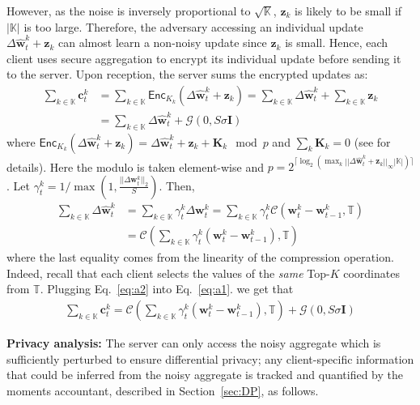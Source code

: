 \documentclass[accepted]{uai2021} %
\newcommand{\mbf}[1]{{\mathbf{#1}}}
\newcommand{\TOPK}{Top-$K$\xspace}
\begin{document}
However, as the noise is inversely proportional to $\sqrt{\mathbb{K}}$, 
$\mbf{z}_{k}$ is likely to be small if $|\mathbb{K}|$ is too large. Therefore, the adversary accessing an individual update $\Delta \hat{\mbf{w}}_t^k + \mbf{z}_{k}$ can almost learn a non-noisy update since $\mbf{z}_{k}$ is small. Hence, each client uses secure aggregation to encrypt its individual update before sending it to the server. Upon reception, the server sums the encrypted updates as:
\begin{align}
\sum_{k\in\mathbb{K}} \mathbf{c}_t^k &= \sum_{k\in\mathbb{K}}\mathsf{Enc}_{K_k}(\Delta \hat{\mbf{w}}_t^k + \mbf{z}_{k}) \nonumber 
 = \sum_{k\in\mathbb{K}} \Delta \hat{\mbf{w}}_t^k + \sum_{k\in\mathbb{K}}\mbf{z}_{k} \nonumber \\
& = \sum_{k\in\mathbb{K}} \Delta \hat{\mbf{w}}_t^k + \mathcal{G}(0,S\mathbb{\sigma}\mathbf{I}) \label{eq:a1}
\end{align}
where $\mathsf{Enc}_{K_k}(\Delta \hat{\mbf{w}}_t^k + \mbf{z}_{k})= \Delta \hat{\mbf{w}}_t^k + \mbf{z}_{k} + \mbf{K}_k \mod p$ and $\sum_{k}\mbf{K}_k=0$ (see \cite{AcsC11,BonawitzIKMMPRS16} for details). Here the modulo is taken element-wise and $p=2^{\lceil \log_{2}(\max_{k}|| \Delta \hat{\mbf{w}}_t^k + \mbf{z}_{k}||_{\infty}|\mathbb{K}|)\rceil}$.
Let $\gamma_t^k = 1/\max\left(1, \frac{||\Delta \mbf{w}_t^k||_2}{S}\right)$. Then, 
\begin{align}
\sum_{k \in \mathbb{K}} \Delta \hat{\mbf{w}}_t^k &= \sum_{k\in \mathbb{K}} \gamma_t^k \Delta \mbf{w}_t^k  \nonumber
 = \sum_{k\in \mathbb{K}} \gamma_t^k \mathcal{C}(\mbf{w}_{t}^k- \mbf{w}_{t-1}^k, \mathbb{T}) \nonumber \\
& = \mathcal{C}(\sum_{k\in \mathbb{K}} \gamma_t^k (\mbf{w}_{t}^k- \mbf{w}_{t-1}^k), \mathbb{T}) \label{eq:a2}
\end{align}
where the last equality comes from the linearity of the compression operation. Indeed, recall that each client selects the values of the \emph{same} \TOPK coordinates from $\mathbb{T}$. 
Plugging Eq.~\eqref{eq:a2} into Eq.~\eqref{eq:a1}. we get that
\begin{align*}
\sum_{k\in\mathbb{K}} \mathbf{c}_t^k = \mathcal{C}(\sum_{k\in \mathbb{K}} \gamma_t^k (\mbf{w}_{t}^k- \mbf{w}_{t-1}^k), \mathbb{T}) + \mathcal{G}(0,S\mathbb{\sigma}\mathbf{I})
\end{align*}

\noindent \textbf{Privacy analysis:}
The server can only access the noisy aggregate  which is sufficiently perturbed to ensure differential privacy; any client-specific information that could be inferred from the noisy aggregate is tracked and quantified by the moments accountant, described in Section~\ref{sec:DP}, as follows. 
\end{document}
